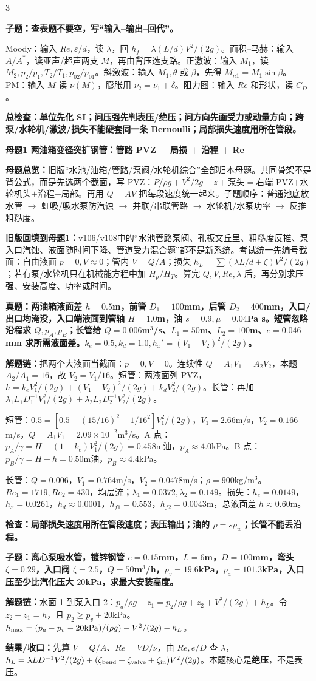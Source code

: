 \documentclass[a4paper]{article}
\newcommand{\mt}[1]{\vspace{0.12pt}\colorbox{M}{\parbox{\dimexpr\linewidth-2\fboxsep}{\color{white}\bfseries #1}}\par}
\newcommand{\qt}[1]{\vspace{0.04pt}\colorbox{Q}{\parbox{\dimexpr\linewidth-2\fboxsep}{\color{white}\bfseries #1}}\par}
\newcommand{\ans}[1]{\colorbox{G}{\parbox{\dimexpr\linewidth-2\fboxsep}{#1}}\par}
\newcommand{\warn}[1]{\colorbox{Y}{\parbox{\dimexpr\linewidth-2\fboxsep}{\color{E}\bfseries #1}}\par}
\newcommand{\chain}[1]{{\color{A}\bfseries 解题链：}#1\par}
\newcommand{\res}[1]{{\color{E}\bfseries 结果/收口：}#1\par}
\newcommand{\mview}[1]{\ans{\textbf{母题总览：}#1}}
\begin{document}
\begin{multicols}{3}
\qt{子题：查表题不要空，写“输入--输出--回代”。}
\ans{Moody：输入 $Re,\varepsilon/d$，读 $\lambda$，回 $h_f=\lambda(L/d)V^2/(2g)$。面积--马赫：输入 $A/A^*$，读亚声/超声两支 $M$，再由背压选支路。正激波：输入 $M_1$，读 $M_2,p_2/p_1,T_2/T_1,p_{02}/p_{01}$。斜激波：输入 $M_1,\theta$ 或 $\beta$，先得 $M_{n1}=M_1\sin\beta$。PM：输入 $M$ 读 $\nu(M)$，膨胀用 $\nu_2=\nu_1+\delta$。阻力图：输入 $Re$ 和形状，读 $C_D$。}
\warn{总检查：单位先化 SI；问压强先判表压/绝压；问方向先画受力或动量方向；跨泵/水轮机/激波/损失不能硬套同一条 Bernoulli；局部损失速度用所在管段。}


\mt{母题1 两油箱变径突扩钢管：管路 PVZ + 局损 + 沿程 + Re}
\mview{旧版“水池/油箱/管路/泵阀/水轮机综合”全部归本母题。共同骨架不是背公式，而是先选两个截面，写 PVZ：$P/\rho g+V^2/2g+z+$泵头$=$右端 PVZ$+$水轮机头$+$沿程$+$局部。再用 $Q=AV$ 把每段速度统一起来。子题顺序：普通池底放水管 $\to$ 虹吸/吸水泵防汽蚀 $\to$ 并联/串联管路 $\to$ 水轮机/水泵功率 $\to$ 反推粗糙度。}
\ans{\textbf{旧版回填到母题1：}v106/v108中的“水池管路泵阀、孔板文丘里、粗糙度反推、泵入口汽蚀、液面随时间下降、管道受力混合题”都不是新系统。考试统一先编号截面：自由液面 $p=0,V\approx0$；管内 $V=Q/A$；损失 $h_L=\sum(\lambda L/d+\zeta)V^2/(2g)$；若有泵/水轮机只在机械能方程中加 $H_p/H_T$。算完 $Q,V,Re,\lambda$ 后，再分别求压强、安装高度、功率或时间。}
\qt{真题：两油箱液面差 $h=0.5$m，前管 $D_1=100$mm，后管 $D_2=400$mm，入口/出口均淹没，入口端液面到管轴 $H=1.0$m，油 $s=0.9,\mu=0.04$Pa s。短管忽略沿程求 $Q,p_A,p_B$；长管给 $Q=0.006$m$^3$/s、$L_1=50$m、$L_2=100$m、$e=0.046$mm 求所需液面差。$k_e=0.5,k_d=1.0,h_x'=(V_1-V_2)^2/(2g)$。}
\chain{把两个大液面当截面：$p=0,V=0$。连续性 $Q=A_1V_1=A_2V_2$，本题 $A_2/A_1=16$，故 $V_2=V_1/16$。短管：两液面列 PVZ，$h=k_eV_1^2/(2g)+(V_1-V_2)^2/(2g)+k_dV_2^2/(2g)$。长管：再加 $\lambda_1L_1D_1^{-1}V_1^2/(2g)+\lambda_2L_2D_2^{-1}V_2^2/(2g)$。}
\ans{短管：$0.5=[0.5+(15/16)^2+1/16^2]V_1^2/(2g)$，$V_1=2.66$m/s，$V_2=0.166$m/s，$Q=A_1V_1=2.09\times10^{-2}$m$^3$/s。A 点：$p_A/\gamma=H-(1+k_e)V_1^2/(2g)=0.458$m油，$p_A\approx4.0$kPa。B 点：$p_B/\gamma=H-h=0.50$m油，$p_B\approx4.4$kPa。}
\ans{长管：$Q=0.006$，$V_1=0.764$m/s，$V_2=0.0478$m/s；$\rho=900$kg/m$^3$。$Re_1=1719,Re_2=430$，均层流；$\lambda_1=0.0372,\lambda_2=0.149$。损失：$h_e=0.0149$，$h_x=0.0261$，$h_d\approx0.0001$，$h_{f1}=0.553$，$h_{f2}=0.0043$m，总液面差 $h\approx0.60$m。}
\warn{检查：局部损失速度用所在管段速度；表压输出；油的 $\rho=s\rho_w$；长管不能丢沿程。}

\qt{子题：离心泵吸水管，镀锌钢管 $e=0.15$mm，$L=6$m，$D=100$mm，弯头 $\zeta=0.29$，入口阀 $\zeta=2.5$，$Q=50$m$^3$/h，$p_v=19.6$kPa，$p_a=101.3$kPa，入口压至少比汽化压大 $20$kPa，求最大安装高度。}
\chain{水面 1 到泵入口 2：$p_a/\rho g+z_1=p_2/\rho g+z_2+V^2/(2g)+h_L$。令 $z_2-z_1=h$，且 $p_2\ge p_v+20$kPa。$h_{\max}=(p_a-p_v-20{\rm kPa})/(\rho g)-V^2/(2g)-h_L$。}
\res{先算 $V=Q/A$、$Re=VD/\nu$，由 $Re,e/D$ 查 $\lambda$，$h_L=\lambda LD^{-1}V^2/(2g)+(\zeta_{\rm bend}+\zeta_{\rm valve}+\zeta_{\rm in}) V^2/(2g)$。本题核心是\textbf{绝压}，不是表压。}


\end{multicols}
\end{document}
